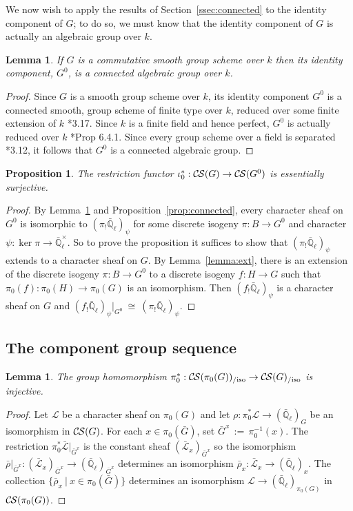 \documentclass[10pt]{amsart}
\theoremstyle{plain}
\newtheorem{proposition}[theorem]{Proposition}
\newtheorem{lemma}[theorem]{Lemma}
\theoremstyle{definition}
\newcommand{\EE}{\mathbb{\bar Q}_\ell}
\newcommand{\Fq}{k}
\newcommand{\EEx}{\EE^\times}
\newcommand{\ceq}{{\, :=\, }}
\newcommand{\tq}{{\ \vert\ }}
\newcommand{\iso}{{\ \cong\ }}
\newcommand{\cs}[1]{{\mathcal{#1}}}
\newcommand{\gcs}[1]{{\mathcal{\bar #1}}}
\newcommand{\CS}{{\mathcal{C\hskip-0.8pt S}}}
\newcommand{\CSiso}[1]{\CS(#1)_{/\text{iso}}}
\newcommand{\bG}{\bar{G}}
\newcommand{\brho}{{\bar\rho}}
\begin{document}
We now wish to apply the results of Section~\ref{ssec:connected} to the identity component of $G$; to do so, we must know that the identity component of $G$ is actually an algebraic group over $\Fq$.

\begin{lemma} \label{lem:G0alg-grp}
If $G$ is a commutative smooth group scheme over $\Fq$ then its identity component, $G^0$, is a connected algebraic group over $\Fq$.
\end{lemma}
\begin{proof}
 Since $G$ is a smooth group scheme over $\Fq$, its
 identity component $G^0$ is a connected smooth,
 group scheme of finite type over $\Fq$, reduced over some finite extension of $\Fq$
 \cite{vdGeer-Moonen:AbelianVarieties}*{3.17}.
 Since $\Fq$ is a finite field and hence perfect, $G^0$ is actually reduced over $\Fq$
 \cite{EGAIV2}*{Prop 6.4.1}.  Since every group scheme over a field is separated
 \cite{vdGeer-Moonen:AbelianVarieties}*{3.12},
 it follows that $G^0$ is a connected algebraic group.
\end{proof}

\begin{proposition}\label{prop:restriction}
The restriction functor $\iota_0^* : \CS(G)\to \CS(G^0)$ is essentially surjective.
\end{proposition}

\begin{proof}
  By Lemma~\ref{lem:G0alg-grp} and Proposition~\ref{prop:connected}, every
  character sheaf on $G^0$ is isomorphic to $(\pi_! \EE)_\psi$ for some discrete isogeny $\pi : B \to G^0$ and character $\psi : \ker \pi \to \EEx$.
  So to prove the proposition it suffices to show that $(\pi_! \EE)_\psi$ extends to a character sheaf on $G$.
%
 By Lemma~\ref{lemma:ext}, there is an extension of the
 discrete isogeny $\pi : B \to G^0$ to a discrete isogeny $f : H \to G$
 such that $\pi_0(f) : \pi_0(H)\to \pi_0(G)$ is an isomorphism.
 Then $(f_! \EE)_\psi$ is a character sheaf on $G$ and
 $(f_! \EE)_\psi\vert_{G^0} \iso (\pi_! \EE)_\psi$.
\end{proof}

\subsection{The component group sequence} \label{ssec:component}

\begin{lemma}\label{lem:extension}
The group homomorphism $\pi_0^*: \CSiso{\pi_0(G)} \to \CSiso{G}$ is injective.
\end{lemma}
\begin{proof}
Let $\cs{L}$ be a character sheaf on $\pi_0(G)$ and let $\rho : \pi_0^*\cs{L} \to (\EE)_{G}$ be an isomorphism in $\CS(G)$. 
For each $x\in \pi_0(\bG)$, set $\bG^x \ceq \pi_0^{-1}(x)$.
The restriction $\pi_0^*\gcs{L}\vert_{\bG^x}$ is the constant sheaf $(\gcs{L}_x)_{\bG^x}$ so the isomorphism $\brho\vert_{\bG^x} : (\gcs{L}_x)_{\bG^x} \to (\EE)_{\bG^x}$ determines an isomorphism $\brho_x : \gcs{L}_x \to (\EE)_x$. The collection $\{ \brho_x \tq x\in \pi_0(\bG) \}$ determines an isomorphism $\cs{L} \to (\EE)_{\pi_0(G)}$  in $\CS(\pi_0(G))$.
\end{proof}
\end{document}
